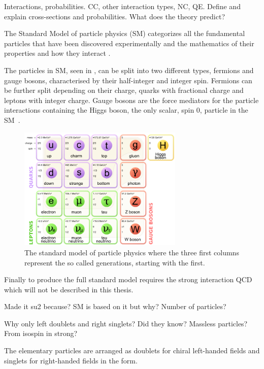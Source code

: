 Interactions, probabilities. CC, other interaction types, NC, QE. Define and explain cross-sections and probabilities. What does the theory predict?

The Standard Model of particle physics (SM) categorizes all the fundamental particles that have been discovered experimentally and the mathematics of their properties and how they interact \cite{32Burchan:1995, 38griffiths}. 

The particles in SM, seen in , can be split into two different types, fermions and gauge bosons, characterised by their half-integer and integer spin. Fermions can be further split depending on their charge, quarks with fractional charge and leptons with integer charge. Gauge bosons are the force mediators for the particle interactions containing the Higgs boson, the only scalar, spin 0, particle in the SM~\cite{35Higgs}.

\begin{figure}[h!]
\includegraphics[width=0.7\textwidth]{figures/Standard_Model_of_Elementary_Particles.png}
\caption{The standard model of particle physics where the three first columns represent the so called generations, starting with the first. \cite{33wiki1:Online}}
\label{fig:standardModel}
\end{figure}

Finally to produce the full standard model requires the strong interaction QCD which will not be described in this thesis.

Made it su2  because? SM is based on it but why? Number of particles?

Why only left doublets and right singlets? Did they know? Massless particles? From isospin in strong?

The elementary particles are arranged as doublets for chiral left-handed fields and singlets for right-handed fields in the form.

